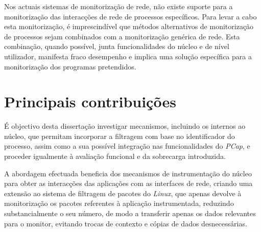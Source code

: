Nos actuais sistemas de monitorização de rede, não existe suporte para a monitorização das interacções de rede de processos específicos.
Para levar a cabo esta monitorização, é imprescindível que métodos alternativos de monitorização de processos sejam combinados com a monitorização genérica de rede.
Esta combinação, quando possível, junta funcionalidades do núcleo e de nível utilizador, manifesta fraco desempenho e implica uma solução específica para a monitorização dos programas pretendidos.



\section{Principais contribuições} 
\label{sec:intro_contribuicoes}

É objectivo desta dissertação investigar mecanismos, incluindo os internos ao núcleo, que permitam incorporar a filtragem com base no identificador do processo, assim como a sua possível integração nas funcionalidades do \textit{PCap}, e proceder igualmente à avaliação funcional e da sobrecarga introduzida.

A abordagem efectuada beneficia dos mecanismos de instrumentação do núcleo para obter as interacções das aplicações com as interfaces de rede, criando uma extensão ao sistema de filtragem de pacotes do \textit{Linux}, que apenas devolve à monitorização os pacotes referentes à aplicação instrumentada, reduzindo substancialmente o seu número, de modo a transferir apenas os dados relevantes para o monitor, evitando trocas de contexto e cópias de dados desnecessárias.

